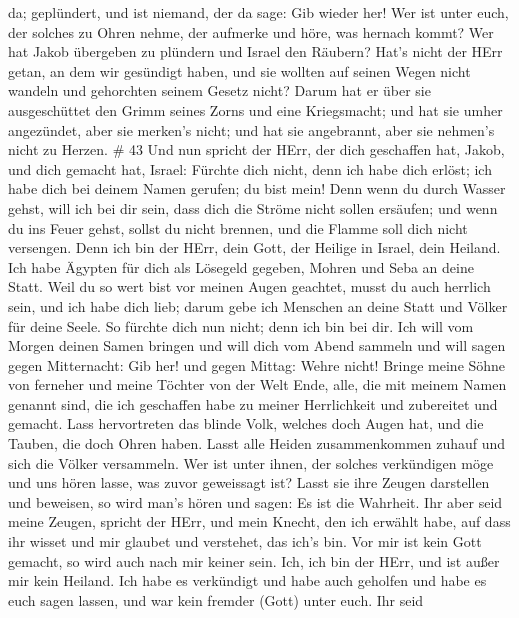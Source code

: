 da; geplündert, und ist niemand, der da sage: Gib wieder her!
 Wer ist unter euch, der solches zu Ohren nehme, der
aufmerke und höre, was hernach kommt?  Wer hat Jakob
übergeben zu plündern und Israel den Räubern? Hat's nicht der HErr
getan, an dem wir gesündigt haben, und sie wollten auf seinen Wegen
nicht wandeln und gehorchten seinem Gesetz nicht?  Darum
hat er über sie ausgeschüttet den Grimm seines Zorns und eine
Kriegsmacht; und hat sie umher angezündet, aber sie merken's nicht; und
hat sie angebrannt, aber sie nehmen's nicht zu Herzen. \# 43
 Und nun spricht der HErr, der dich geschaffen hat, Jakob,
und dich gemacht hat, Israel: Fürchte dich nicht, denn ich habe dich
erlöst; ich habe dich bei deinem Namen gerufen; du bist mein!
 Denn wenn du durch Wasser gehst, will ich bei dir sein,
dass dich die Ströme nicht sollen ersäufen; und wenn du ins Feuer gehst,
sollst du nicht brennen, und die Flamme soll dich nicht versengen.
 Denn ich bin der HErr, dein Gott, der Heilige in Israel,
dein Heiland. Ich habe Ägypten für dich als Lösegeld gegeben, Mohren und
Seba an deine Statt.  Weil du so wert bist vor meinen Augen
geachtet, musst du auch herrlich sein, und ich habe dich lieb; darum
gebe ich Menschen an deine Statt und Völker für deine Seele.
 So fürchte dich nun nicht; denn ich bin bei dir. Ich will
vom Morgen deinen Samen bringen und will dich vom Abend sammeln
 und will sagen gegen Mitternacht: Gib her! und gegen
Mittag: Wehre nicht! Bringe meine Söhne von ferneher und meine Töchter
von der Welt Ende,  alle, die mit meinem Namen genannt sind,
die ich geschaffen habe zu meiner Herrlichkeit und zubereitet und
gemacht.  Lass hervortreten das blinde Volk, welches doch
Augen hat, und die Tauben, die doch Ohren haben.  Lasst alle
Heiden zusammenkommen zuhauf und sich die Völker versammeln. Wer ist
unter ihnen, der solches verkündigen möge und uns hören lasse, was zuvor
geweissagt ist? Lasst sie ihre Zeugen darstellen und beweisen, so wird
man's hören und sagen: Es ist die Wahrheit.  Ihr aber seid
meine Zeugen, spricht der HErr, und mein Knecht, den ich erwählt habe,
auf dass ihr wisset und mir glaubet und verstehet, das ich's bin. Vor
mir ist kein Gott gemacht, so wird auch nach mir keiner sein.
 Ich, ich bin der HErr, und ist außer mir kein Heiland.
 Ich habe es verkündigt und habe auch geholfen und habe es
euch sagen lassen, und war kein fremder (Gott) unter euch. Ihr seid
